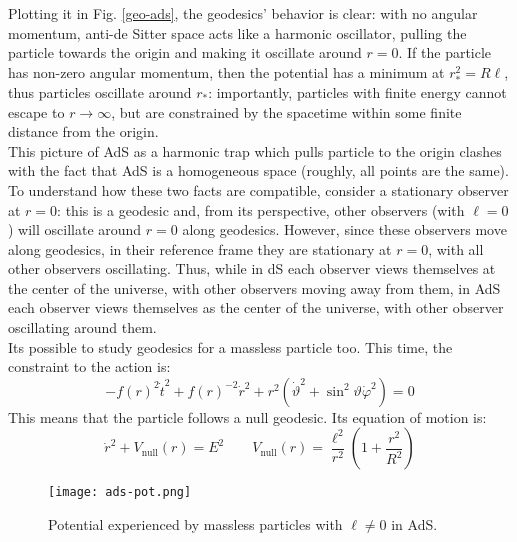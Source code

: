 Plotting it in Fig. \ref{geo-ads}, the geodesics' behavior is clear: with no angular momentum, anti-de Sitter space acts like a harmonic oscillator, pulling the particle towards the origin and making it oscillate around $ r = 0 $. If the particle has non-zero angular momentum, then the potential has a minimum at $ r_*^2 = R \ell $, thus particles oscillate around $ r_* $: importantly, particles with finite energy cannot escape to $ r \rightarrow \infty $, but are constrained by the spacetime within some finite distance from the origin.\\
This picture of AdS as a harmonic trap which pulls particle to the origin clashes with the fact that AdS is a homogeneous space (roughly, all points are the same). To understand how these two facts are compatible, consider a stationary observer at $ r = 0 $: this is a geodesic and, from its perspective, other observers (with $ \ell = 0 $) will oscillate around $ r = 0 $ along geodesics. However, since these observers move along geodesics, in their reference frame they are stationary at $ r = 0 $, with all other observers oscillating. Thus, while in dS each observer views themselves at the center of the universe, with other observers moving away from them, in AdS each observer views themselves as the center of the universe, with other observer oscillating around them.\\
Its possible to study geodesics for a massless particle too. This time, the constraint to the action is:
\begin{equation*}
  - f(r)^2 \dot{t}^2 + f(r)^{-2} \dot{r}^2 + r^2 (\dot{\vartheta}^2 + \sin^2 \vartheta \dot{\varphi}^2) = 0
\end{equation*}
This means that the particle follows a null geodesic. Its equation of motion is:
\begin{equation*}
  \dot{r}^2 + V_{\text{null}}(r) = E^2
  \qquad
  V_{\text{null}}(r) = \frac{\ell^2}{r^2} \left( 1 + \frac{r^2}{R^2} \right)
\end{equation*}

\begin{figure}
  \centering
  \texttt{[image: ads-pot.png]}
  \caption{Potential experienced by massless particles with $ \ell \neq 0 $ in AdS.}
  \label{ads-pot}
\end{figure}

